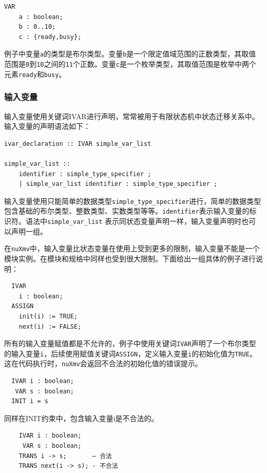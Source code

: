 \begin{lstlisting}
VAR
    a : boolean;
    b : 0..10;
    c : {ready,busy};
\end{lstlisting}

例子中变量\verb|a|的类型是布尔类型。变量\verb|b|是一个限定值域范围的正数类型，其取值范围是\verb|0|到\verb|10|之间的\verb|11|个正数。变量\verb|c|是一个枚举类型，其取值范围是枚举中两个元素\verb|ready|和\verb|busy|。


\subsubsection{输入变量}
输入变量使用关键词IVAR进行声明，常常被用于有限状态机中状态迁移关系中。输入变量的声明语法如下：

\begin{lstlisting}
ivar_declaration :: IVAR simple_var_list

simple_var_list ::
    identifier : simple_type_specifier ;
    | simple_var_list identifier : simple_type_specifier ;
\end{lstlisting}

输入变量使用只能简单的数据类型\verb|simple_type_specifier|进行，简单的数据类型包含基础的布尔类型、整数类型、实数类型等等。\verb|identifier|表示输入变量的标识符。语法中\verb|simple_var_list| 表示同状态变量声明一样，输入变量声明时也可以声明一组。

在\verb|nuXmv|中，输入变量比状态变量在使用上受到更多的限制，输入变量不能是一个模块实例。在模块和规格中同样也受到很大限制。下面给出一组具体的例子进行说明：

\begin{lstlisting}
  IVAR
    i : boolean;
  ASSIGN
    init(i) := TRUE;
    next(i) := FALSE;
\end{lstlisting}

所有的输入变量赋值都是不允许的，例子中使用关键词\verb|IVAR|声明了一个布尔类型的输入变量\verb|i|，后续使用赋值关键词\verb|ASSIGN|，定义输入变量\verb|i|的初始化值为\verb|TRUE|。 这在代码执行时，\verb|nuXmv|会返回不合法的初始化值的错误提示。

\begin{lstlisting}
  IVAR i : boolean;
   VAR s : boolean;
  INIT i = s
\end{lstlisting}

同样在INIT约束中，包含输入变量i是不合法的。

\begin{lstlisting}
    IVAR i : boolean;
     VAR s : boolean;
    TRANS i -> s;       – 合法
    TRANS next(i -> s); - 不合法
\end{lstlisting}

